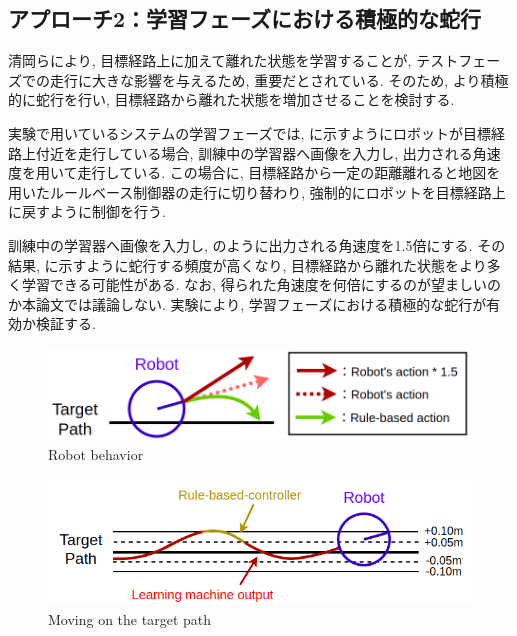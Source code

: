 \newpage

\subsection{アプローチ2：学習フェーズにおける積極的な蛇行}
清岡ら\cite{kiyooka}により, 目標経路上に加えて離れた状態を学習することが, テストフェーズでの走行に大きな影響を与えるため, 重要だとされている. そのため, より積極的に蛇行を行い, 目標経路から離れた状態を増加させることを検討する. \par
実験で用いているシステムの学習フェーズでは,  に示すようにロボットが目標経路上付近を走行している場合, 訓練中の学習器へ画像を入力し, 出力される角速度を用いて走行している. この場合に, 目標経路から一定の距離離れると地図を用いたルールベース制御器の走行に切り替わり, 強制的にロボットを目標経路上に戻すように制御を行う. \par
訓練中の学習器へ画像を入力し, のように出力される角速度を1.5倍にする. その結果, に示すように蛇行する頻度が高くなり, 目標経路から離れた状態をより多く学習できる可能性がある. なお, 得られた角速度を何倍にするのが望ましいのか本論文では議論しない. 実験により, 学習フェーズにおける積極的な蛇行が有効か検証する.

\begin{figure}[hbtp]
  \centering
 \includegraphics[keepaspectratio, scale=0.43]
      {images/3action.png}
 \caption{Robot behavior}
 \label{Fig:3action}
\end{figure}

\begin{figure}[hbtp]
  \centering
 \includegraphics[keepaspectratio, scale=0.58]
      {images/act1.0.png}
 \caption{Moving on the target path}
 \label{Fig:act1.0}
\end{figure}

